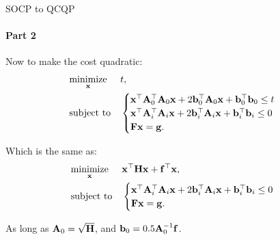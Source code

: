 \documentclass{beamer}
\begin{document}
\begin{frame}{SOCP to QCQP}
\framesubtitle{Part 2}
\begin{flushleft}


Now to make the cost quadratic:
%
\begin{equation}
\begin{aligned}
& \underset{\mathbf{x}}{\text{minimize}}
& & t, \\
& \text{subject to}
& & \begin{cases}
    \mathbf{x}^\top \mathbf{A}_0^\top \mathbf{A}_0 \mathbf{x} + 
    2 \mathbf{b}_0^\top \mathbf{A}_0\mathbf{x} + 
    \mathbf{b}_0^\top \mathbf{b}_0  \leq t\\
    \mathbf{x}^\top \mathbf{A}_i^\top \mathbf{A}_i \mathbf{x} + 
    2 \mathbf{b}_i^\top \mathbf{A}_i\mathbf{x} + 
    \mathbf{b}_i^\top \mathbf{b}_i  \leq 0\\
    \mathbf{F}\mathbf{x} = \mathbf{g}.
    \end{cases}
\end{aligned}
\end{equation}

Which is the same as:
%
\begin{equation}
\begin{aligned}
& \underset{\mathbf{x}}{\text{minimize}}
& & \mathbf{x}^\top \mathbf{H} \mathbf{x} + \mathbf{f}^\top\mathbf{x}, \\
& \text{subject to}
& & \begin{cases}
    \mathbf{x}^\top \mathbf{A}_i^\top \mathbf{A}_i \mathbf{x} + 
    2 \mathbf{b}_i^\top \mathbf{A}_i\mathbf{x} + 
    \mathbf{b}_i^\top \mathbf{b}_i  \leq 0\\
    \mathbf{F}\mathbf{x} = \mathbf{g}.
    \end{cases}
\end{aligned}
\end{equation}

As long as $\mathbf{A}_0 = \sqrt{\mathbf{H}}$, and $\mathbf{b}_0 = 0.5 \mathbf{A}_0^{-1} \mathbf{f}$.

\end{flushleft}
\end{frame}
\end{document}
